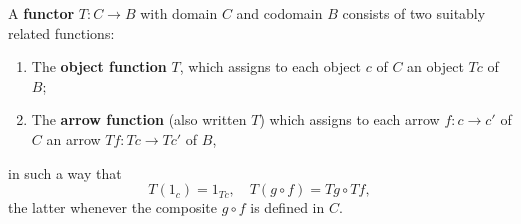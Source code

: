 A \textbf{functor} $T: C \rightarrow B$ with domain $C$ and codomain $B$ consists of two suitably related functions:
\begin{enumerate}
  \item The \textbf{object function} $T$, which assigns to each object $c$ of $C$ an object $Tc$ of $B$;
  \item The \textbf{arrow function} (also written $T$) which assigns to each arrow $f: c \rightarrow c'$ of $C$ an arrow $Tf: Tc \rightarrow Tc'$ of $B$,
\end{enumerate}
in such a way that
$$T(1_c) = 1_{Tc}, \quad T(g \circ f) = Tg \circ Tf,$$
the latter whenever the composite $g \circ f$ is defined in $C$.
